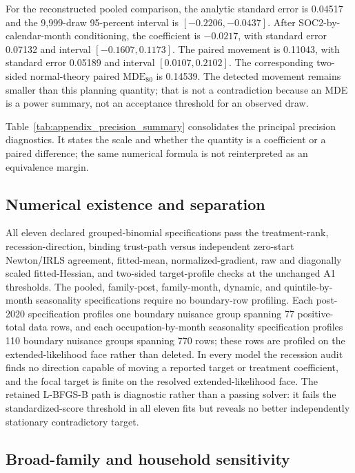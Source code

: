 For the reconstructed pooled comparison, the analytic standard error is 0.04517 and the 9,999-draw 95-percent interval is $[-0.2206,-0.0437]$.  After SOC2-by-calendar-month conditioning, the coefficient is $-0.0217$, with standard error 0.07132 and interval $[-0.1607,0.1173]$.  The paired movement is 0.11043, with standard error 0.05189 and interval $[0.0107,0.2102]$.  The corresponding two-sided normal-theory paired $\mathrm{MDE}_{80}$ is 0.14539.  The detected movement remains smaller than this planning quantity; that is not a contradiction because an MDE is a power summary, not an acceptance threshold for an observed draw.

Table~\ref{tab:appendix_precision_summary} consolidates the principal precision diagnostics.  It states the scale and whether the quantity is a coefficient or a paired difference; the same numerical formula is not reinterpreted as an equivalence margin.



\subsection{Numerical existence and separation}

All eleven declared grouped-binomial specifications pass the treatment-rank,
recession-direction, binding trust-path versus independent zero-start
Newton/IRLS agreement, fitted-mean, normalized-gradient, raw and diagonally
scaled fitted-Hessian, and two-sided target-profile checks at the unchanged A1
thresholds.  The pooled, family-post, family-month, dynamic, and
quintile-by-month seasonality specifications require no boundary-row profiling.
Each post-2020 specification profiles one boundary nuisance group spanning 77
positive-total data rows, and each occupation-by-month seasonality specification
profiles 110 boundary nuisance groups spanning 770 rows; these rows are
profiled on the extended-likelihood face rather than deleted.  In every model
the recession audit finds no direction capable of moving a reported target or
treatment coefficient, and the focal target is finite on the resolved
extended-likelihood face.  The retained L-BFGS-B path is diagnostic rather than
a passing solver: it fails the standardized-score threshold in all eleven fits
but reveals no better independently stationary contradictory target.

\subsection{Broad-family and household sensitivity}

